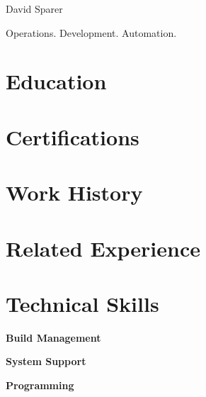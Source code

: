 \documentclass{cls/res}
\begin{document}
	\thispagestyle{empty} %

	\begin{resume}
		\vspace{-0.5in}
		\centerline{{\Huge David Sparer}}
		\vspace{.2in}
		\centerline{Operations. Development. Automation.}
		\centerline{}

		\section{Education}
			\vspace{0.1in}
			

		\section{Certifications}
			\vspace{0.1in}
			

		\section{Work History}
			\vspace{0.1in}
			
			
			
			
			
			

		\section{Related Experience}
			\vspace{0.1in}
			

		\section{Technical Skills}
			\vspace{0.1in}
			{\bf Build Management}
				\vspace{-0.1in}
				
			\vspace{-0.1in}
			{\bf System Support}
				\vspace{-0.1in}
				
			\vspace{-0.1in}
			{\bf Programming}
				\vspace{-0.1in}
				

	\end{resume}
\end{document}
